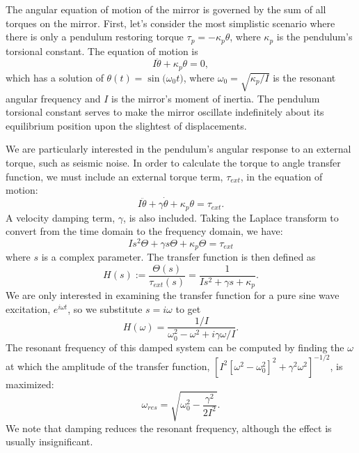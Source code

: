 The angular equation of motion of the mirror is governed by the sum of
all torques on the mirror. First, let's consider the most simplistic
scenario where there is only a pendulum restoring torque
$\tau_p=-\kappa_p \theta$, where $\kappa_p$ is the pendulum's
torsional constant. The equation of motion is
\begin{equation}
I \ddot{\theta} + \kappa_p \theta = 0,
\end{equation}
which has a solution of $\theta(t) = \sin({\omega_0 t)}$, where
$\omega_0 = \sqrt{\kappa_p/I}$ is the resonant angular frequency and
$I$ is the mirror's moment of inertia. The pendulum torsional constant
serves to make the mirror oscillate indefinitely about its equilibrium
position upon the slightest of displacements.

We are particularly interested in the pendulum's angular response to an
external torque, such as seismic noise. In order to calculate the
torque to angle transfer function, we must include an external torque
term, $\tau_{ext}$, in the equation of motion:
\begin{equation}
I \ddot{\theta} + \gamma \dot{\theta} + \kappa_p \theta = \tau_{ext}.
\label{eq:eqmotion}
\end{equation}
A velocity damping term, $\gamma$, is also included. Taking the Laplace transform to convert from the time domain to the frequency domain, we have:
\begin{equation}
I s^2 \Theta + \gamma s \Theta + \kappa_p \Theta = \tau_{ext}
\end{equation}
where $s$ is a complex parameter. The transfer function is then
defined as
\begin{equation}
H(s) := \frac{\Theta(s)}{\tau_{ext}(s)} = \frac{1}{I s^2 + \gamma s + \kappa_p}.
\label{eq:TF}
\end{equation}
We are only interested in examining the transfer function for a pure
sine wave excitation, $e^{i\omega t}$, so we substitute $s=i\omega$ to
get
\begin{equation}
H(\omega) = \frac{1/I}{\omega_0^2  - \omega^2 + i \gamma \omega / I}.
\end{equation}
The resonant frequency of this damped system can be computed by finding the
$\omega$ at which the amplitude of the transfer function, $[I^2
[\omega^2 - \omega_0^2]^2 + \gamma^2 \omega^2]^{-1/2}$, is maximized:
\begin{equation}
\omega_{res} = \sqrt{\omega_0^2 - \frac{\gamma^2}{2I^2}}.
\end{equation}
We note that damping reduces the resonant frequency, although the effect is usually insignificant.

